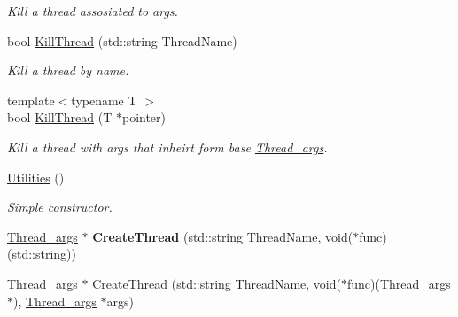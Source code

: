 \begin{DoxyCompactItemize}
\begin{DoxyCompactList}\small\item\em Kill a thread assosiated to args. \end{DoxyCompactList}\item 
\hypertarget{classUtilities_a8c17a46ce33b0b647797f24bc859bd7a}{bool \hyperlink{classUtilities_a8c17a46ce33b0b647797f24bc859bd7a}{Kill\-Thread} (std\-::string Thread\-Name)}\label{classUtilities_a8c17a46ce33b0b647797f24bc859bd7a}

\begin{DoxyCompactList}\small\item\em Kill a thread by name. \end{DoxyCompactList}\item 
\hypertarget{classUtilities_af4091a68d8a27a3b806d029cc9b2135e}{{\footnotesize template$<$typename T $>$ }\\bool \hyperlink{classUtilities_af4091a68d8a27a3b806d029cc9b2135e}{Kill\-Thread} (T $\ast$pointer)}\label{classUtilities_af4091a68d8a27a3b806d029cc9b2135e}

\begin{DoxyCompactList}\small\item\em Kill a thread with args that inheirt form base \hyperlink{structThread__args}{Thread\-\_\-args}. \end{DoxyCompactList}\item 
\hypertarget{classUtilities_ab1676c9ce35cf347a73d16f1094e1271}{\hyperlink{classUtilities_ab1676c9ce35cf347a73d16f1094e1271}{Utilities} ()}\label{classUtilities_ab1676c9ce35cf347a73d16f1094e1271}

\begin{DoxyCompactList}\small\item\em Simple constructor. \end{DoxyCompactList}\item 
\hypertarget{classUtilities_ac9c2f86e8279a0341dcf8ce85a92c86b}{\hyperlink{structThread__args}{Thread\-\_\-args} $\ast$ {\bfseries Create\-Thread} (std\-::string Thread\-Name, void($\ast$func)(std\-::string))}\label{classUtilities_ac9c2f86e8279a0341dcf8ce85a92c86b}

\item 
\hypertarget{classUtilities_a7598372bbee218ec15275f7a84d9ff6a}{\hyperlink{structThread__args}{Thread\-\_\-args} $\ast$ \hyperlink{classUtilities_a7598372bbee218ec15275f7a84d9ff6a}{Create\-Thread} (std\-::string Thread\-Name, void($\ast$func)(\hyperlink{structThread__args}{Thread\-\_\-args} $\ast$), \hyperlink{structThread__args}{Thread\-\_\-args} $\ast$args)}\label{classUtilities_a7598372bbee218ec15275f7a84d9ff6a}


\end{DoxyCompactItemize}
